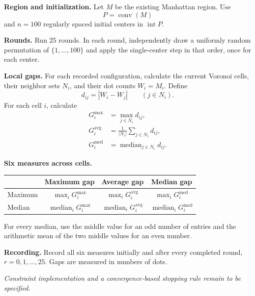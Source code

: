 \documentclass[11pt]{article}
\newcommand{\interior}{\operatorname{int}}
\begin{document}
\textbf{Region and initialization.}
Let $M$ be the existing Manhattan region. Use
\[
P=\operatorname{conv}(M)
\]
and $n=100$ regularly spaced initial centers in $\interior P$.

\textbf{Rounds.}
Run $25$ rounds. In each round, independently draw a uniformly random
permutation of $\{1,\ldots,100\}$ and apply the single-center step in
that order, once for each center.

\textbf{Local gaps.}
For each recorded configuration, calculate the current Voronoi cells,
their neighbor sets $N_i$, and their dot counts $W_i=M_i$. Define
\[
d_{ij}=|W_i-W_j|\qquad(j\in N_i).
\]
For each cell $i$, calculate
\begin{align*}
G_i^{\max}&=\max_{j\in N_i}d_{ij},
\\[4pt]
G_i^{\mathrm{avg}}&=\frac{1}{|N_i|}\sum_{j\in N_i}d_{ij},
\\[4pt]
G_i^{\mathrm{med}}&=\operatorname{median}_{j\in N_i}d_{ij}.
\end{align*}

\textbf{Six measures across cells.}
\begin{center}
\renewcommand{\arraystretch}{1.7}
\begin{tabular}{@{}lccc@{}}
\toprule
 & Maximum gap & Average gap & Median gap \\
\midrule
Maximum
 & $\max_i G_i^{\max}$
 & $\max_i G_i^{\mathrm{avg}}$
 & $\max_i G_i^{\mathrm{med}}$ \\
Median
 & $\operatorname{median}_i G_i^{\max}$
 & $\operatorname{median}_i G_i^{\mathrm{avg}}$
 & $\operatorname{median}_i G_i^{\mathrm{med}}$ \\
\bottomrule
\end{tabular}
\end{center}
For every median, use the middle value for an odd number of entries
and the arithmetic mean of the two middle values for an even number.

\textbf{Recording.}
Record all six measures initially and after every completed round,
$r=0,1,\ldots,25$. Gaps are measured in numbers of dots.

\medskip
\textit{Constraint implementation and a convergence-based stopping rule
remain to be specified.}
\end{document}
